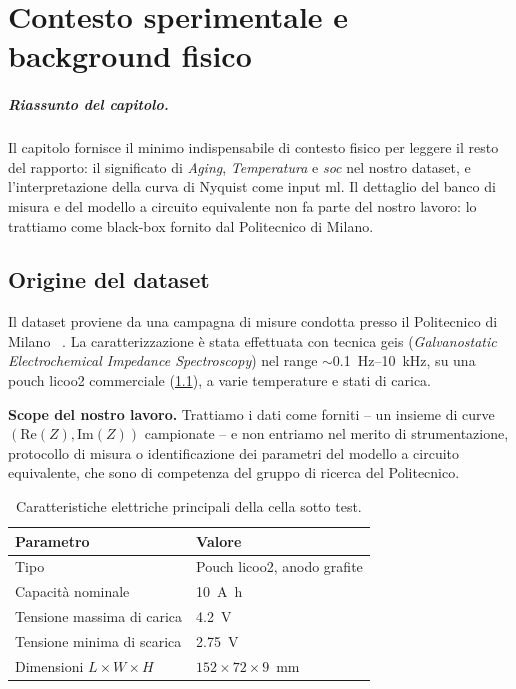 \chapter{Contesto sperimentale e background fisico}
\label{chap:background}

\paragraph{Riassunto del capitolo.} Il capitolo fornisce il minimo
indispensabile di contesto fisico per leggere il resto del rapporto: il
significato di \emph{Aging}, \emph{Temperatura} e \emph{\acrshort{soc}}
nel nostro dataset, e l'interpretazione della curva di Nyquist come
input \acrshort{ml}. Il dettaglio del banco di misura e del modello a
circuito equivalente non fa parte del nostro lavoro: lo trattiamo come
black-box fornito dal Politecnico di Milano.

\section{Origine del dataset}
\label{sec:experimental-setup}

Il dataset proviene da una campagna di misure condotta presso il
Politecnico di Milano ~\cite{polimi2025battery}. La
caratterizzazione è stata effettuata con tecnica
\acrshort{geis} (\emph{Galvanostatic Electrochemical Impedance
Spectroscopy}) nel range $\sim$\SI{0.1}{\hertz}--\SI{10}{\kilo\hertz},
su una pouch \acrshort{licoo2} commerciale (\cref{tab:cell-specs}), a
varie temperature e stati di carica.

\textbf{Scope del nostro lavoro.} Trattiamo i dati come forniti -- un
insieme di curve $(\mathrm{Re}(Z), \mathrm{Im}(Z))$ campionate -- e non
entriamo nel merito di strumentazione, protocollo di misura o
identificazione dei parametri del modello a circuito equivalente, che
sono di competenza del gruppo di ricerca del Politecnico.

\begin{table}[H]
  \centering
  \caption{Caratteristiche elettriche principali della cella sotto test.}
  \label{tab:cell-specs}
  \begin{tabular}{ll}
    \toprule
    \textbf{Parametro} & \textbf{Valore} \\
    \midrule
    Tipo                                  & Pouch \acrshort{licoo2}, anodo grafite \\
    Capacità nominale                     & \SI{10}{\ampere\hour} \\
    Tensione massima di carica            & \SI{4.2}{\volt} \\
    Tensione minima di scarica            & \SI{2.75}{\volt} \\
    Dimensioni $L \times W \times H$      & $152 \times 72 \times 9$~mm \\
    \bottomrule
  \end{tabular}
\end{table}

